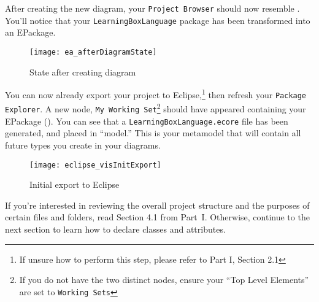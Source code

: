 \begin{stepbystep}
 
\item After creating the new diagram, your  \texttt{Project Browser} should now resemble . You'll notice
that your \texttt{LearningBoxLanguage} package has been transformed into an EPackage.

\begin{figure}[htbp]
	\centering
  \texttt{[image: ea\_afterDiagramState]}
	\caption{State after creating diagram}
	\label{ea:diagramComplete}
\end{figure}
\FloatBarrier

\item You can now already export your project to Eclipse,\footnote{If unsure how to perform this step, please refer to Part I, Section
2.1} then refresh your \texttt{Package Explorer}. A new node, \texttt{My Working Set}\footnote{If you do not have the two distinct nodes, ensure your ``Top
Level Elements'' are set to \texttt{Working Sets}} should have appeared containing your EPackage (). You can see that a
\texttt{LearningBoxLanguage.ecore} file has been generated, and placed in ``model.'' This is your metamodel that will contain all future types you create in
your diagrams.

\clearpage

\vspace*{2cm}

\begin{figure}[htbp]
	\centering
  \texttt{[image: eclipse\_visInitExport]}
	\caption{Initial export to Eclipse}
	\label{eclipse:initExport}
\end{figure}

\vspace{1cm}

\item If you're interested in reviewing the overall project structure and the purposes of certain files and folders, read Section 4.1
from Part~I. Otherwise, continue to the next section to learn how to declare classes and attributes.

\end{stepbystep}
